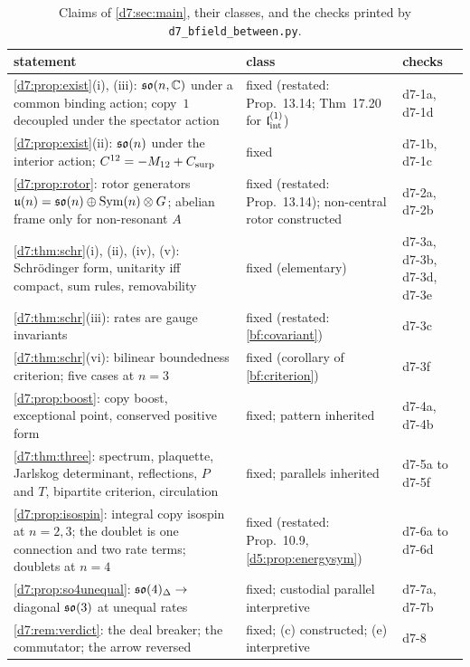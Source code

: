 \begin{table}[t]
\centering
\footnotesize
\begin{tabular}{@{}>{\raggedright\arraybackslash}p{8.1cm}>{\raggedright\arraybackslash}p{5.0cm}>{\raggedright\arraybackslash}p{2.0cm}@{}}
\toprule
statement & class & checks\\
\midrule
\cref{d7:prop:exist}(i), (iii): $\mathfrak{so}(n,\mathbb{C})$ under a common binding action; copy~$1$ decoupled under the spectator action & fixed (restated: Prop.~13.14; Thm~17.20 for $\mathfrak l_{\rm int}^{(1)}$) & d7-1a, d7-1d\\
\cref{d7:prop:exist}(ii): $\mathfrak{so}(n)$ under the interior action; $C^{12}=-M_{12}+C_{\rm surp}$ & fixed & d7-1b, d7-1c\\
\cref{d7:prop:rotor}: rotor generators $\mathfrak{u}(n)=\mathfrak{so}(n)\oplus\operatorname{Sym}(n)\otimes G$; abelian frame only for non-resonant $A$ & fixed (restated: Prop.~13.14); non-central rotor constructed & d7-2a, d7-2b\\
\cref{d7:thm:schr}(i), (ii), (iv), (v): Schr\"odinger form, unitarity iff compact, sum rules, removability & fixed (elementary) & d7-3a, d7-3b, d7-3d, d7-3e\\
\cref{d7:thm:schr}(iii): rates are gauge invariants & fixed (restated: \cref{bf:covariant}) & d7-3c\\
\cref{d7:thm:schr}(vi): bilinear boundedness criterion; five cases at $n=3$ & fixed (corollary of \cref{bf:criterion}) & d7-3f\\
\cref{d7:prop:boost}: copy boost, exceptional point, conserved positive form & fixed; pattern inherited & d7-4a, d7-4b\\
\cref{d7:thm:three}: spectrum, plaquette, Jarlskog determinant, reflections, $P$ and $T$, bipartite criterion, circulation & fixed; parallels inherited & d7-5a to d7-5f\\
\cref{d7:prop:isospin}: integral copy isospin at $n=2,3$; the doublet is one connection and two rate terms; doublets at $n=4$ & fixed (restated: Prop.~10.9, \cref{d5:prop:energysym}) & d7-6a to d7-6d\\
\cref{d7:prop:so4unequal}: $\mathfrak{so}(4)_\Delta\to$ diagonal $\mathfrak{so}(3)$ at unequal rates & fixed; custodial parallel interpretive & d7-7a, d7-7b\\
\cref{d7:rem:verdict}: the deal breaker; the commutator; the arrow reversed & fixed; (c) constructed; (e) interpretive & d7-8\\
\bottomrule
\end{tabular}
\caption{Claims of \cref{d7:sec:main}, their classes, and the checks printed by \texttt{d7\_bfield\_between.py}.}
\label{d7:tab:claims}
\end{table}

